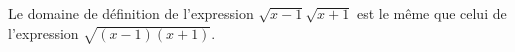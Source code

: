 Le domaine de définition de l'expression $\sqrt{x-1}\sqrt{x+1}$ est le même que celui de l'expression $\sqrt{(x-1)(x+1)}$.

\begin{reponses}
\end{reponses}


